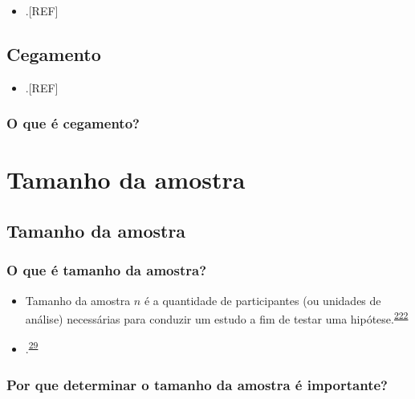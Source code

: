 \documentclass[
  a4paper,
]{book}
\providecommand{\tightlist}{%
  \setlength{\itemsep}{0pt}\setlength{\parskip}{0pt}}
\begin{document}
\begin{itemize}
\tightlist
\item
  .{[}REF{]}
\end{itemize}

\hypertarget{cegamento}{%
\section{Cegamento}\label{cegamento}}

\begin{itemize}
\tightlist
\item
  .{[}REF{]}
\end{itemize}

\hypertarget{o-que-uxe9-cegamento}{%
\subsection{O que é cegamento?}\label{o-que-uxe9-cegamento}}

\hypertarget{tamanho-amostral}{%
\chapter{\texorpdfstring{\textbf{Tamanho da amostra}}{Tamanho da amostra}}\label{tamanho-amostral}}

\hypertarget{tamanho-da-amostra}{%
\section{Tamanho da amostra}\label{tamanho-da-amostra}}

\hypertarget{o-que-uxe9-tamanho-da-amostra}{%
\subsection{O que é tamanho da amostra?}\label{o-que-uxe9-tamanho-da-amostra}}

\begin{itemize}
\item
  Tamanho da amostra \(n\) é a quantidade de participantes (ou unidades de análise) necessárias para conduzir um estudo a fim de testar uma hipótese.\textsuperscript{\protect\hyperlink{ref-rodruxedguezdeluxe1guila2014}{222}}
\item
  .\textsuperscript{\protect\hyperlink{ref-Banerjee2010}{29}}
\end{itemize}

\hypertarget{por-que-determinar-o-tamanho-da-amostra-uxe9-importante}{%
\subsection{Por que determinar o tamanho da amostra é importante?}\label{por-que-determinar-o-tamanho-da-amostra-uxe9-importante}}
\end{document}
